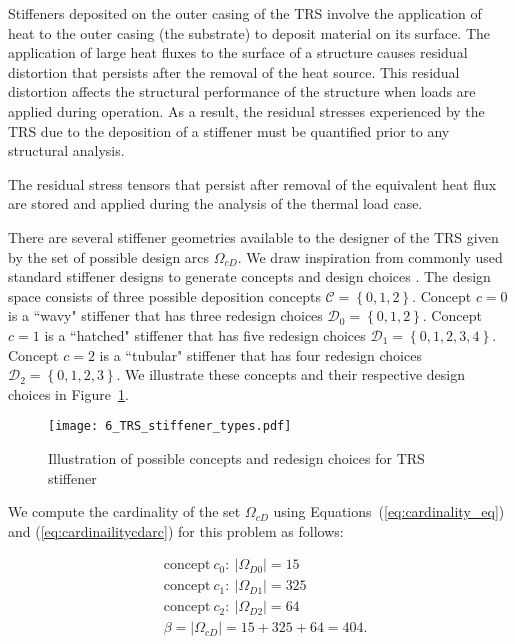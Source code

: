 Stiffeners deposited on the outer casing of the \ac{TRS} involve the application of heat to the outer casing (the substrate) to deposit material on its surface. The application of large heat fluxes to the surface of a structure causes residual distortion that persists after the removal of the heat source. This residual distortion affects the structural performance of the structure when loads are applied during operation. As a result, the residual stresses experienced by the \ac{TRS} due to the deposition of a stiffener must be quantified prior to any structural analysis.

The residual stress tensors that persist after removal of the equivalent heat flux are stored and applied during the analysis of the thermal load case.

There are several stiffener geometries available to the designer of the \ac{TRS} given by the set of possible design arcs $\Omega_{cD}$. We draw inspiration from commonly used standard stiffener designs to generate concepts and design choices \cite{USArmyMaterielCommand1970}. The design space consists of three possible deposition concepts $\mathcal{C} = \left\{0,1,2\right\}$. Concept $c=0$ is a ``wavy" stiffener that has three redesign choices $\mathcal{D}_0 = \left\{0,1,2\right\}$. Concept $c=1$ is a ``hatched" stiffener that has five redesign choices $\mathcal{D}_1 = \left\{0,1,2,3,4\right\}$. Concept $c=2$ is a ``tubular" stiffener that has four redesign choices $\mathcal{D}_2 = \left\{0,1,2,3\right\}$. We illustrate these concepts and their respective design choices in Figure~\ref{fig:designspacestiff}.
%
\begin{figure}[h]
	\centering
	\texttt{[image: 6\_TRS\_stiffener\_types.pdf]}
	\caption{Illustration of possible concepts and redesign choices for \ac{TRS} stiffener}
	\label{fig:designspacestiff}
\end{figure}

We compute the cardinality of the set $\Omega_{cD}$ using Equations~(\ref{eq:cardinality_eq}) and (\ref{eq:cardinailitycdarc}) for this problem as follows:

\begin{equation*}
	\begin{aligned}
		& \mathrm{concept~}c_0:~|\Omega_{D0}| = 15\\
		& \mathrm{concept~}c_1:~|\Omega_{D1}| = 325\\
		& \mathrm{concept~}c_2:~|\Omega_{D2}| = 64\\
		& \beta = |\Omega_{cD}| = 15 + 325 + 64 = 404.\\
	\end{aligned}
\end{equation*}

